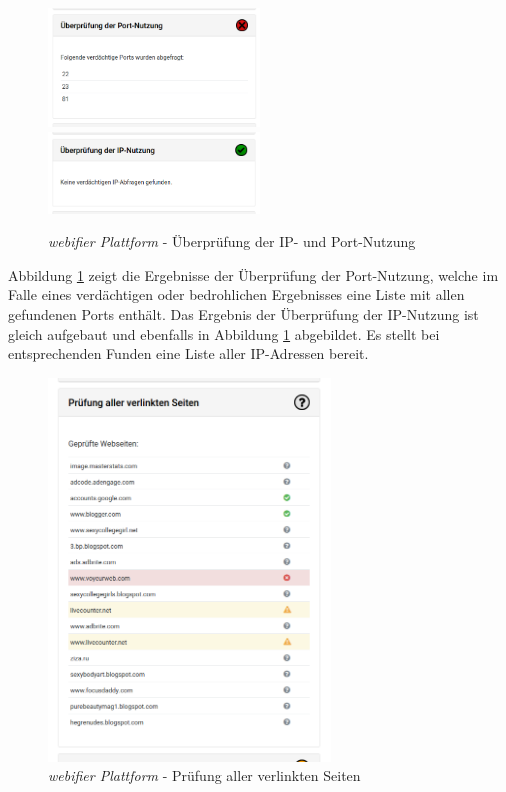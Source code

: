 \begin{figure}[H]
\centerline{%
\includegraphics[width=0.5\textwidth]{images/platform/portscan-malicious}%
\includegraphics[width=0.5\textwidth]{images/platform/ipscan-clean}%
}%
\caption{\textit{webifier Plattform} - Überprüfung der IP- und Port-Nutzung}
\label{fig:platform-result-portscan}
\end{figure}

Abbildung \ref{fig:platform-result-portscan} zeigt die Ergebnisse der Überprüfung der Port-Nutzung, welche im Falle eines verdächtigen oder bedrohlichen Ergebnisses eine Liste mit allen gefundenen Ports enthält. Das Ergebnis der Überprüfung der IP-Nutzung ist gleich aufgebaut und ebenfalls in Abbildung \ref{fig:platform-result-portscan} abgebildet. Es stellt bei entsprechenden Funden eine Liste aller IP-Adressen bereit.

\begin{figure}[H]
  \centering
  \includegraphics[width=7.5cm]{images/platform/linkchecker-undefined}
  \caption{\textit{webifier Plattform} - Prüfung aller verlinkten Seiten}
  \label{fig:platform-result-linkchecker}
\end{figure}

